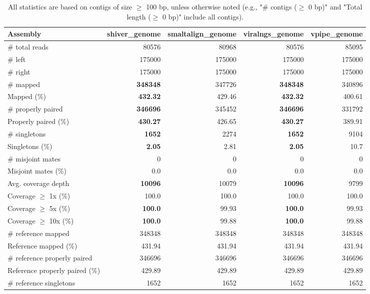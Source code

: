 \documentclass[12pt,a4paper]{article}
\begin{document}
\begin{table}[ht]
\begin{center}
\caption{All statistics are based on contigs of size $\geq$ 100 bp, unless otherwise noted (e.g., "\# contigs ($\geq$ 0 bp)" and "Total length ($\geq$ 0 bp)" include all contigs).}
\begin{tabular}{|l*{4}{|r}|}
\hline
Assembly & shiver\_genome & smaltalign\_genome & viralngs\_genome & vpipe\_genome \\ \hline
\# total reads & 80576 & 80968 & 80576 & 85095 \\ \hline
\# left & 175000 & 175000 & 175000 & 175000 \\ \hline
\# right & 175000 & 175000 & 175000 & 175000 \\ \hline
\# mapped & {\bf 348348} & 347726 & {\bf 348348} & 340896 \\ \hline
Mapped (\%) & {\bf 432.32} & 429.46 & {\bf 432.32} & 400.61 \\ \hline
\# properly paired & {\bf 346696} & 345452 & {\bf 346696} & 331792 \\ \hline
Properly paired (\%) & {\bf 430.27} & 426.65 & {\bf 430.27} & 389.91 \\ \hline
\# singletons & {\bf 1652} & 2274 & {\bf 1652} & 9104 \\ \hline
Singletons (\%) & {\bf 2.05} & 2.81 & {\bf 2.05} & 10.7 \\ \hline
\# misjoint mates & 0 & 0 & 0 & 0 \\ \hline
Misjoint mates (\%) & 0.0 & 0.0 & 0.0 & 0.0 \\ \hline
Avg. coverage depth & {\bf 10096} & 10079 & {\bf 10096} & 9799 \\ \hline
Coverage $\geq$ 1x (\%) & 100.0 & 100.0 & 100.0 & 100.0 \\ \hline
Coverage $\geq$ 5x (\%) & {\bf 100.0} & 99.93 & {\bf 100.0} & 99.93 \\ \hline
Coverage $\geq$ 10x (\%) & {\bf 100.0} & 99.88 & {\bf 100.0} & 99.88 \\ \hline
\# reference mapped & 348348 & 348348 & 348348 & 348348 \\ \hline
Reference mapped (\%) & 431.94 & 431.94 & 431.94 & 431.94 \\ \hline
\# reference properly paired & 346696 & 346696 & 346696 & 346696 \\ \hline
Reference properly paired (\%) & 429.89 & 429.89 & 429.89 & 429.89 \\ \hline
\# reference singletons & 1652 & 1652 & 1652 & 1652 \\ \hline

\end{tabular}
\end{center}
\end{table}
\end{document}
